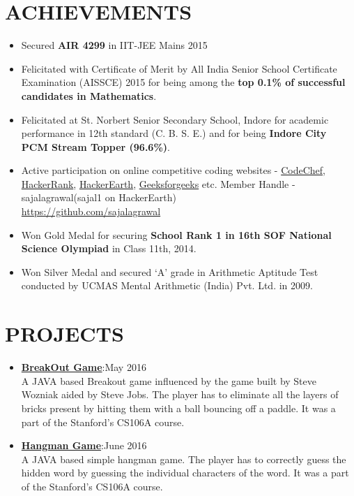 \documentclass[line, margin]{res}
\begin{document}
\begin{resume}
\section{ACHIEVEMENTS}
\begin{itemize}
\item Secured \textbf{AIR 4299} in IIT-JEE Mains 2015
\item Felicitated with Certificate of Merit by All India Senior School Certificate Examination (AISSCE) 2015 for being among the \textbf{top 0.1\% of successful candidates in Mathematics}.
\item Felicitated at St. Norbert Senior Secondary School, Indore for academic performance in 12th standard (C. B. S. E.) and for being \textbf{Indore City PCM Stream Topper (96.6\%)}.
\item Active participation on online competitive coding websites - \href{https://www.codechef.com/users/sajalagrawal}{CodeChef}, \href{https://www.hackerrank.com/sajalagrawal}{HackerRank}, \href{https://www.hackerearth.com/@sajal1}{HackerEarth}, \href{http://www.practice.geeksforgeeks.org/user-profile.php?user=sajalagrawal}{Geeksforgeeks} etc.
Member Handle - sajalagrawal(sajal1 on HackerEarth)\\
\href{https://github.com/sajalagrawal}{https://github.com/sajalagrawal}
\item Won Gold Medal for securing \textbf{School Rank 1 in 16th SOF National Science Olympiad} in Class 11th, 2014.
\item Won Silver Medal and secured ‘A’ grade in Arithmetic Aptitude Test conducted by UCMAS Mental Arithmetic (India) Pvt. Ltd. in 2009.
\end{itemize}

\section{PROJECTS}
\begin{itemize}
\item\textbf{\href{https://github.com/sajalagrawal/Breakout-Game}{BreakOut Game}}:\hfill May 2016\\ A JAVA based Breakout game influenced by the game built by Steve Wozniak aided by Steve Jobs. The player has to eliminate all the layers of bricks present by hitting them with a ball bouncing off a paddle. It was a part of the Stanford's CS106A course.
\item\textbf{\href{https://github.com/sajalagrawal/Hangman-Game}{Hangman Game}}:\hfill June 2016\\ A JAVA based simple hangman game. The player has to correctly guess the hidden word by guessing the individual characters of the word. It was a part of the Stanford's CS106A course.
\end{itemize}


\end{resume}
\end{document}

